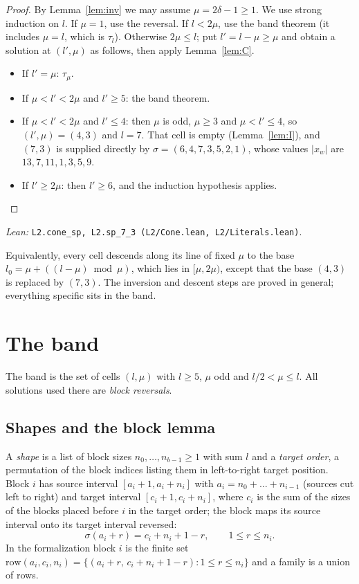 \documentclass[11pt]{amsart}
\theoremstyle{plain}
\theoremstyle{definition}
\theoremstyle{remark}
\newcommand{\lean}[1]{\par\smallskip
  {\small\raggedright\noindent\textit{Lean:} \texttt{#1}.\par}\smallskip}
\begin{document}
\begin{proof}
By Lemma~\ref{lem:inv} we may assume $\mu = 2\delta-1 \ge 1$. We use strong induction on
$l$. If $\mu = 1$, use the reversal. If $l < 2\mu$, use the band theorem (it includes
$\mu = l$, which is $\tau_l$). Otherwise $2\mu \le l$; put $l' = l - \mu \ge \mu$ and
obtain a solution at $(l',\mu)$ as follows, then apply Lemma~\ref{lem:C}.
\begin{itemize}
\item If $l' = \mu$: $\tau_\mu$.
\item If $\mu < l' < 2\mu$ and $l' \ge 5$: the band theorem.
\item If $\mu < l' < 2\mu$ and $l' \le 4$: then $\mu$ is odd, $\mu \ge 3$ and
  $\mu < l' \le 4$, so $(l',\mu) = (4,3)$ and $l = 7$. That cell is empty
  (Lemma~\ref{lem:I}), and $(7,3)$ is supplied directly by
  $\sigma = (6,4,7,3,5,2,1)$, whose values $|x_w|$ are $13,7,11,1,3,5,9$.
\item If $l' \ge 2\mu$: then $l' \ge 6$, and the induction hypothesis applies.\qedhere
\end{itemize}
\end{proof}
\lean{L2.cone\_sp, L2.sp\_7\_3 (L2/Cone.lean, L2/Literals.lean)}

Equivalently, every cell descends along its line of fixed $\mu$ to the base
$l_0 = \mu + ((l-\mu) \bmod \mu)$, which lies in $[\mu,2\mu)$, except that the base
$(4,3)$ is replaced by $(7,3)$. The inversion and descent steps are proved in general;
everything specific sits in the band.

\section{The band}\label{sec:band}

The band is the set of cells $(l,\mu)$ with $l \ge 5$, $\mu$ odd and
$l/2 < \mu \le l$. All solutions used there are \emph{block reversals}.

\subsection*{Shapes and the block lemma}
A \emph{shape} is a list of block sizes $n_0,\dots,n_{b-1} \ge 1$ with sum $l$ and a
\emph{target order}, a permutation of the block indices listing them in left-to-right
target position. Block $i$ has source interval $[a_i+1,a_i+n_i]$ with
$a_i = n_0 + \dots + n_{i-1}$ (sources cut left to right) and target interval
$[c_i+1,c_i+n_i]$, where $c_i$ is the sum of the sizes of the blocks placed before $i$ in
the target order; the block maps its source interval onto its target interval reversed:
\[
  \sigma(a_i + r) = c_i + n_i + 1 - r, \qquad 1 \le r \le n_i .
\]
In the formalization block $i$ is the finite set
$\mathrm{row}(a_i,c_i,n_i) = \{(a_i+r,\, c_i+n_i+1-r) : 1 \le r \le n_i\}$ and a family is
a union of rows.
\end{document}
